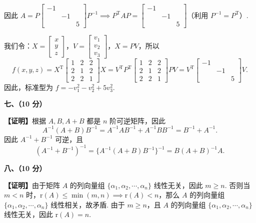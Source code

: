 \documentclass[a4paper,11pt]{ctexart}
\newcommand{\rk}{\mathrm{r}}
\newcommand{\T}{\mathrm{T}}
\begin{document}
因此 $A = P \begin{bmatrix} -1 & & \\ & -1 & \\ & & 5 \end{bmatrix} P^{-1} \implies P^{\T} A P = \begin{bmatrix} -1 & & \\ & -1 & \\ & & 5 \end{bmatrix}$（利用 $P^{-1} = P^{\T}$）.

我们令：$X = \begin{bmatrix} x \\ y \\ z \end{bmatrix}$，$V = \begin{bmatrix} v_1 \\ v_2 \\ v_3 \end{bmatrix}$，$X = PV$，所以
\[
  f(x, y, z) = X^{\T} \begin{bmatrix} 1 & 2 & 2 \\ 2 & 1 & 2 \\ 2 & 2 & 1 \end{bmatrix} X
  = V^{\T} P^{\T} \begin{bmatrix} 1 & 2 & 2 \\ 2 & 1 & 2 \\ 2 & 2 & 1 \end{bmatrix} PV
  = V^{\T} \begin{bmatrix} -1 & & \\ & -1 & \\ & & 5 \end{bmatrix} V.
\]
因此，标准型为 $f = -v_1^2 - v_2^2 + 5v_3^2$.

\vspace{0.8em}

\textbf{七、（10 分）}

\textbf{【证明】}根据 $A, B, A + B$ 都是 $n$ 阶可逆矩阵，因此
\[
  A^{-1}(A + B)B^{-1} = A^{-1}AB^{-1} + A^{-1}BB^{-1} = B^{-1} + A^{-1}.
\]
因此 $A^{-1} + B^{-1}$ 可逆，且
\[
  (A^{-1} + B^{-1})^{-1} = \{A^{-1}(A + B)B^{-1}\}^{-1} = B(A + B)^{-1}A.
\]

\newpage

\textbf{八、（10 分）}

\textbf{【证明】}由于矩阵 $A$ 的列向量组 $\{\alpha_1, \alpha_2, \cdots, \alpha_n\}$ 线性无关，因此 $m \geqslant n$. 否则当 $m < n$ 时，$\rk(A) \leqslant \min(m, n) \implies \rk(A) < n$，那么 $A$ 的列向量组 $\{\alpha_1, \alpha_2, \cdots, \alpha_n\}$ 线性相关，故矛盾. 由于 $m \geqslant n$，且 $A$ 的列向量组 $\{\alpha_1, \alpha_2, \cdots, \alpha_n\}$ 线性无关，因此 $\rk(A) = n$.
\end{document}
